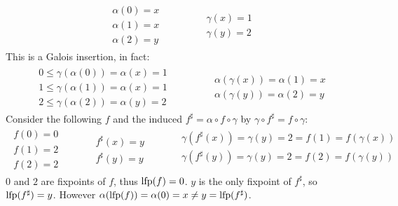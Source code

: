 \begin{exercise}
\begin{enumerate}[1.]
        \begin{gather*}
            \begin{aligned}
                \alpha(0) = x \\
                \alpha(1) = x \\
                \alpha(2) = y
            \end{aligned}
            \qquad\qquad
            \begin{aligned}
                \gamma(x) = 1 \\
                \gamma(y) = 2
            \end{aligned}
        \end{gather*}
        This is a Galois insertion, in fact:
        \begin{gather*}
            \begin{aligned}
                0 \leq \gamma(\alpha(0)) = \alpha(x) = 1 \\
                1 \leq \gamma(\alpha(1)) = \alpha(x) = 1 \\
                2 \leq \gamma(\alpha(2)) = \alpha(y) = 2
            \end{aligned}
            \qquad\qquad
            \begin{aligned}
                \alpha(\gamma(x)) = \alpha(1) = x \\
                \alpha(\gamma(y)) = \alpha(2) = y
            \end{aligned}
        \end{gather*}
        Consider the following $f$ and the induced $f^\sharp = \alpha \circ f \circ \gamma$ by $\gamma \circ f^\sharp = f \circ \gamma$:
        \begin{gather*}
            \begin{aligned}
                f(0) = 0 \\
                f(1) = 2 \\
                f(2) = 2
            \end{aligned}
            \qquad\quad
            \begin{aligned}
                f^\sharp (x) = y \\
                f^\sharp (y) = y
            \end{aligned}
            \qquad\quad
            \begin{aligned}
                \gamma(f^\sharp(x)) = \gamma(y) = 2 = f(1) = f(\gamma(x)) \\
                \gamma(f^\sharp(y)) = \gamma(y) = 2 = f(2) = f(\gamma(y)) \\
            \end{aligned}
        \end{gather*}
        $0$ and $2$ are fixpoints of $f$, thus $\operatorname{lfp}(f) = 0$. $y$ is the only fixpoint of $f^\sharp$, so $\operatorname{lfp}(f^\sharp) = y$. However $\alpha(\operatorname{lfp}(f)) = \alpha(0) = x \neq y = \operatorname{lfp}(f^\sharp)$.
    \end{enumerate}
\end{exercise}

